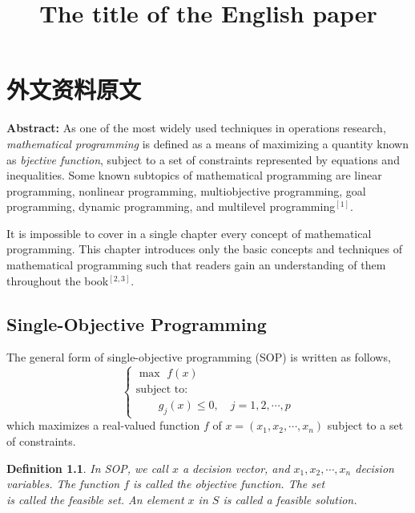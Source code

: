 \chapter{外文资料原文}
\label{cha:engorg}

\title{The title of the English paper}

\textbf{Abstract:} As one of the most widely used techniques in operations
research, \emph{ mathematical programming} is defined as a means of maximizing a
quantity known as \emph{bjective function}, subject to a set of constraints
represented by equations and inequalities. Some known subtopics of mathematical
programming are linear programming, nonlinear programming, multiobjective
programming, goal programming, dynamic programming, and multilevel
programming$^{[1]}$.

It is impossible to cover in a single chapter every concept of mathematical
programming. This chapter introduces only the basic concepts and techniques of
mathematical programming such that readers gain an understanding of them
throughout the book$^{[2,3]}$.


\section{Single-Objective Programming}
The general form of single-objective programming (SOP) is written
as follows,
\begin{equation}\tag*{(123)} %
\left\{\begin{array}{l}
\max \,\,f(x)\\[0.1 cm]
\mbox{subject to:} \\ [0.1 cm]
\qquad g_j(x)\le 0,\quad j=1,2,\cdots,p
\end{array}\right.
\end{equation}
which maximizes a real-valued function $f$ of
$x=(x_1,x_2,\cdots,x_n)$ subject to a set of constraints.

\newtheorem{mpdef}{Definition}[chapter]
\begin{mpdef}
In SOP, we call $x$ a decision vector, and
$x_1,x_2,\cdots,x_n$ decision variables. The function
$f$ is called the objective function. The set
\begin{equation}
  \tag*{(456)} %
\end{equation}
is called the feasible set. An element $x$ in $S$ is called a
feasible solution.
\end{mpdef}

